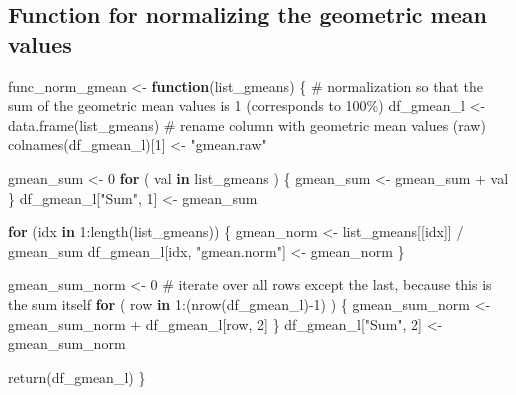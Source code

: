 \documentclass[
]{article}
\newenvironment{Shaded}{\begin{snugshade}}{\end{snugshade}}
\newcommand{\CommentTok}[1]{\textcolor[rgb]{0.54,0.53,0.53}{#1}}
\newcommand{\ControlFlowTok}[1]{\textcolor[rgb]{0.12,0.11,0.11}{\textbf{#1}}}
\newcommand{\DecValTok}[1]{\textcolor[rgb]{0.69,0.50,0.00}{#1}}
\newcommand{\FunctionTok}[1]{\textcolor[rgb]{0.39,0.29,0.61}{#1}}
\newcommand{\NormalTok}[1]{\textcolor[rgb]{0.12,0.11,0.11}{#1}}
\newcommand{\OtherTok}[1]{\textcolor[rgb]{0.00,0.43,0.16}{#1}}
\newcommand{\SpecialCharTok}[1]{\textcolor[rgb]{0.24,0.68,0.91}{#1}}
\newcommand{\StringTok}[1]{\textcolor[rgb]{0.75,0.01,0.01}{#1}}
\begin{document}
\hypertarget{function-for-normalizing-the-geometric-mean-values}{%
\subsection{Function for normalizing the geometric mean
values}\label{function-for-normalizing-the-geometric-mean-values}}

\begin{Shaded}
\begin{Highlighting}[]
\NormalTok{func\_norm\_gmean }\OtherTok{\textless{}{-}} \ControlFlowTok{function}\NormalTok{(list\_gmeans) \{}
  \CommentTok{\# normalization so that the sum of the geometric mean values is 1 (corresponds to 100\%)}
\NormalTok{  df\_gmean\_l }\OtherTok{\textless{}{-}} \FunctionTok{data.frame}\NormalTok{(list\_gmeans)}
  \CommentTok{\# rename column with geometric mean values (raw)}
  \FunctionTok{colnames}\NormalTok{(df\_gmean\_l)[}\DecValTok{1}\NormalTok{] }\OtherTok{\textless{}{-}} \StringTok{"gmean.raw"}
  
\NormalTok{  gmean\_sum }\OtherTok{\textless{}{-}} \DecValTok{0}
  \ControlFlowTok{for}\NormalTok{ ( val }\ControlFlowTok{in}\NormalTok{ list\_gmeans ) \{}
\NormalTok{    gmean\_sum }\OtherTok{\textless{}{-}}\NormalTok{ gmean\_sum }\SpecialCharTok{+}\NormalTok{ val}
\NormalTok{  \}}
\NormalTok{  df\_gmean\_l[}\StringTok{"Sum"}\NormalTok{, }\DecValTok{1}\NormalTok{] }\OtherTok{\textless{}{-}}\NormalTok{ gmean\_sum}
  
  \ControlFlowTok{for}\NormalTok{ (idx }\ControlFlowTok{in} \DecValTok{1}\SpecialCharTok{:}\FunctionTok{length}\NormalTok{(list\_gmeans)) \{}
\NormalTok{    gmean\_norm }\OtherTok{\textless{}{-}}\NormalTok{ list\_gmeans[[idx]] }\SpecialCharTok{/}\NormalTok{ gmean\_sum}
\NormalTok{    df\_gmean\_l[idx, }\StringTok{"gmean.norm"}\NormalTok{] }\OtherTok{\textless{}{-}}\NormalTok{ gmean\_norm}
\NormalTok{  \}}
  
\NormalTok{  gmean\_sum\_norm }\OtherTok{\textless{}{-}} \DecValTok{0}
  \CommentTok{\# iterate over all rows except the last, because this is the sum itself}
  \ControlFlowTok{for}\NormalTok{ ( row }\ControlFlowTok{in} \DecValTok{1}\SpecialCharTok{:}\NormalTok{(}\FunctionTok{nrow}\NormalTok{(df\_gmean\_l)}\SpecialCharTok{{-}}\DecValTok{1}\NormalTok{) ) \{}
\NormalTok{    gmean\_sum\_norm }\OtherTok{\textless{}{-}}\NormalTok{ gmean\_sum\_norm }\SpecialCharTok{+}\NormalTok{ df\_gmean\_l[row, }\DecValTok{2}\NormalTok{]}
\NormalTok{  \}}
\NormalTok{  df\_gmean\_l[}\StringTok{"Sum"}\NormalTok{, }\DecValTok{2}\NormalTok{] }\OtherTok{\textless{}{-}}\NormalTok{ gmean\_sum\_norm}
  
  \FunctionTok{return}\NormalTok{(df\_gmean\_l)}
\NormalTok{\}}
\end{Highlighting}
\end{Shaded}
\end{document}
